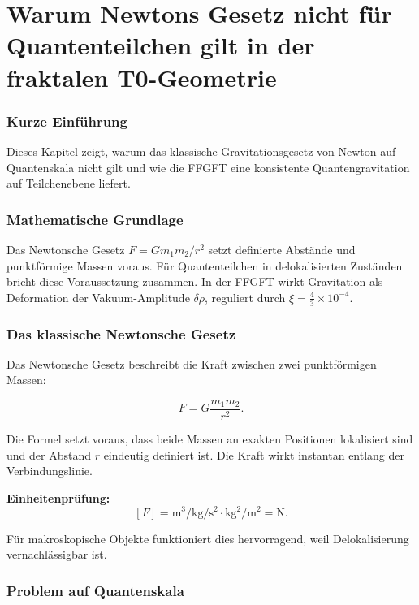 \chapter{Warum Newtons Gesetz nicht für Quantenteilchen gilt in der fraktalen T0-Geometrie}


	
	\subsection*{Kurze Einführung}
	
	Dieses Kapitel zeigt, warum das klassische Gravitationsgesetz von Newton auf Quantenskala nicht gilt und wie die FFGFT eine konsistente Quantengravitation auf Teilchenebene liefert.
	
	\subsection*{Mathematische Grundlage}
	
	Das Newtonsche Gesetz \(F = G m_1 m_2 / r^2\) setzt definierte Abstände und punktförmige Massen voraus. Für Quantenteilchen in delokalisierten Zuständen bricht diese Voraussetzung zusammen. In der FFGFT wirkt Gravitation als Deformation der Vakuum-Amplitude \(\delta \rho\), reguliert durch \(\xi = \frac{4}{3} \times 10^{-4}\).
	

	
	\subsection*{Das klassische Newtonsche Gesetz}
	
	Das Newtonsche Gesetz beschreibt die Kraft zwischen zwei punktförmigen Massen:
	
	\begin{equation}
		F = G \frac{m_1 m_2}{r^2}.
	\end{equation}
	
	Die Formel setzt voraus, dass beide Massen an exakten Positionen lokalisiert sind und der Abstand \(r\) eindeutig definiert ist. Die Kraft wirkt instantan entlang der Verbindungslinie.
	
	\textbf{Einheitenprüfung:}
	\[
	[F] = \si{\meter\cubed\per\kilo\gram\per\second\squared} \cdot \si{\kilo\gram^2} / \si{\meter^2} = \si{\newton}.
	\]
	
	Für makroskopische Objekte funktioniert dies hervorragend, weil Delokalisierung vernachlässigbar ist.
	
	\subsection*{Problem auf Quantenskala}
	
